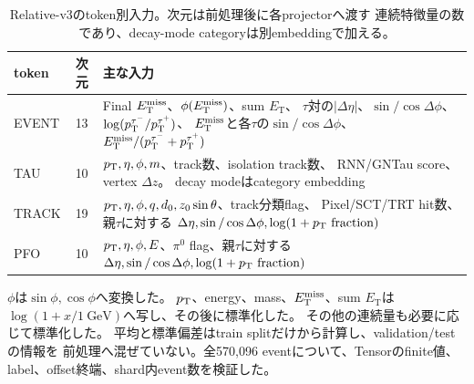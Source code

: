 \documentclass[xelatex,ja=standard,a4paper,10pt,twocolumn]{bxjsarticle}
\begin{document}
\begin{table}[t]
  \centering
  \caption{Relative-v3のtoken別入力。次元は前処理後に各projectorへ渡す
    連続特徴量の数であり、decay-mode categoryは別embeddingで加える。}
  \label{tab:features}
  \small
  \begin{tabularx}{\textwidth}{@{}l c X@{}}
    \toprule
    token & 次元 & 主な入力 \\
    \midrule
    EVENT & 13 &
      Final \(E_{\mathrm{T}}^{\mathrm{miss}}\)、\(\phi(E_{\mathrm{T}}^{\mathrm{miss}})\)、sum \(E_{\mathrm{T}}\)、
      \(\tau\)対の\(|\Delta\eta|\)、\(\sin/\cos\Delta\phi\)、
      \(\log(p_{\mathrm{T}}^{\tau^-}/p_{\mathrm{T}}^{\tau^+})\)、
      \(E_{\mathrm{T}}^{\mathrm{miss}}\)と各\(\tau\)の\(\sin/\cos\Delta\phi\)、
      \(E_{\mathrm{T}}^{\mathrm{miss}}/(p_{\mathrm{T}}^{\tau^-}+p_{\mathrm{T}}^{\tau^+})\) \\
    TAU & 10 &
      \(p_{\mathrm{T}},\eta,\phi,m\)、track数、isolation track数、
      RNN/GNTau score、vertex \(\Delta z\)。
      decay modeはcategory embedding \\
    TRACK & 19 &
      \(p_{\mathrm{T}},\eta,\phi,q,d_0,z_0\sin\theta\)、track分類flag、
      Pixel/SCT/TRT hit数、親\(\tau\)に対する
      \(\Delta\eta,\sin/\cos\Delta\phi,\log(1+\pt\mathrm{\ fraction})\) \\
    PFO & 10 &
      \(p_{\mathrm{T}},\eta,\phi,E\)、\(\pi^0\) flag、親\(\tau\)に対する
      \(\Delta\eta,\sin/\cos\Delta\phi,\log(1+\pt\mathrm{\ fraction})\) \\
    \bottomrule
  \end{tabularx}
\end{table}

\(\phi\)は\(\sin\phi,\cos\phi\)へ変換した。
\(p_{\mathrm{T}}\)、energy、mass、\(E_{\mathrm{T}}^{\mathrm{miss}}\)、sum \(E_{\mathrm{T}}\)は
\(\log(1+x/\SI{1}{\GeV})\)へ写し、その後に標準化した。
その他の連続量も必要に応じて標準化した。
平均と標準偏差はtrain splitだけから計算し、validation/testの情報を
前処理へ混ぜていない。全570,096 eventについて、Tensorのfinite値、
label、offset終端、shard内event数を検証した。
\end{document}

